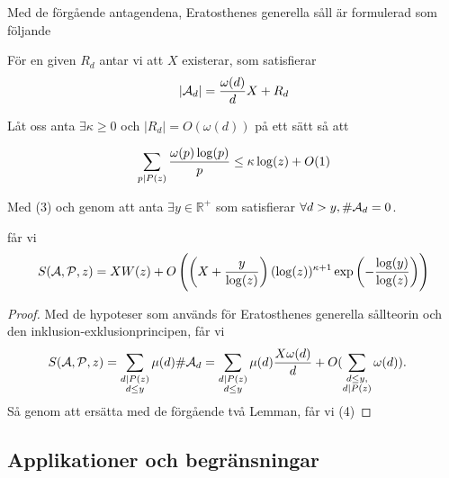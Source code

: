 Med de förgående antagendena, Eratosthenes generella såll är formulerad som följande\cite{Dalton}
\begin{theorem}\hfill

För en given $ R_{d} $ antar vi att $ X $ existerar, som satisfierar
\[\vert\mathcal{A}_{d}\vert =\frac{\omega(d)}{d}X +R_{d} \]

Låt oss anta $ \exists \kappa\geq 0 $ och $ \vert R_{d}\vert = O(\omega(d))$ på ett sätt så att

\[\sum_{p\mid P(z)}\frac{\omega(p)\log(p)}{p}\leq \kappa \log(z)+O(1)\]


Med (3) och genom att anta $ \exists y\in \mathbb{R}^{+} $ som satisfierar $ \forall d>y, \# \mathcal{A}_d=0 $.

får vi
\begin{equation}
\label{equationEL4}
S(\mathcal{\mathcal{A}}, \mathcal{\mathcal{P}}, z)= XW(z)+O\left( \left( X+\frac{y}{\log(z)} \right)(\log(z))^{\kappa+1}\exp \left( -\frac{\log(y)}{\log(z)} \right) \right)
\end{equation}
\end{theorem}
\begin{proof}
Med de hypoteser som används för Eratosthenes generella sållteorin och den inklusion-exklusionprincipen, får vi
\begin{align*}
S(\mathcal{\mathcal{A}}, \mathcal{\mathcal{P}}, z) &=\sum_{\substack{d\mid P(z)\\d\leq y}}\mu(d)\#\mathcal{A}_{d} =\sum_{\substack{d\mid P(z)\\d\leq y}}\mu(d)\frac{X\omega(d)}{d}+O(\sum_{\substack{d\leq y,\\ d \mid P(z)}} \omega(d)).
\end{align*}
Så genom att ersätta med de förgående två Lemman, får vi (4)
\end{proof}


\subsection{Applikationer och begränsningar}


